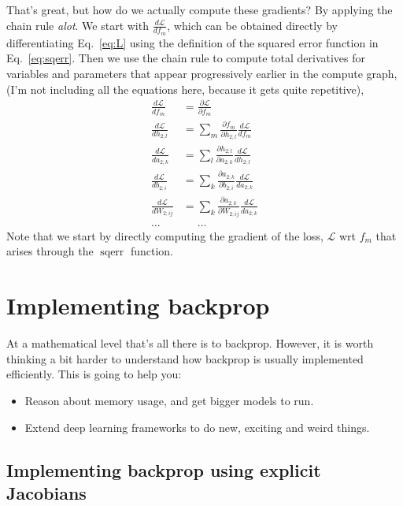 \documentclass{article}
\newcommand{\dd}[2][]{\frac{\partial #1}{\partial #2}}
\newcommand{\dt}[2][]{\frac{d #1}{d #2}}
\newcommand{\dL}{\dt[\L]}
\renewcommand{\L}{\mathcal{L}}
\newcommand{\sqerr}{\operatorname{sqerr}}
\begin{document}
That's great, but how do we actually compute these gradients?
By applying the chain rule \textit{alot}.
We start with $\dL{f_m}$, which can be obtained directly by differentiating Eq.~\eqref{eq:L} using the definition of the squared error function in Eq.~\eqref{eq:sqerr}.
Then we use the chain rule to compute total derivatives for variables and parameters that appear progressively earlier in the compute graph, (I'm not including all the equations here, because it gets quite repetitive),
\begin{subequations}
\label{eq:back_chain}
\begin{align}
  \dL{f_m} &= \dd[\L]{f_m}\\
  \label{eq:back_chain:1}
  \dL{h_{2; l}} &= \sum_m \dd[f_m]{h_{2;l}} \dL{f_m}\\
  \label{eq:back_chain:2}
  \dL{a_{2; k}} &= \sum_l \dd[h_{2;l}]{a_{2;k}} \dL{h_{2; l}}\\
  \dL{b_{2;i}} &= \sum_{k} \dd[a_{2; k}]{b_{2; i}} \dL{a_{2; k}} \\
  \label{eq:back_chain:4}
  \dL{W_{2;ij}} &= \sum_{k} \dd[a_{2; k}]{W_{2; ij}} \dL{a_{2; k}}\\
  \dots &\phantom{=} \dots
\end{align}
\end{subequations}
Note that we start by directly computing the gradient of the loss, $\L$ wrt $f_m$ that arises through the $\sqerr$ function.

\section{Implementing backprop}

At a mathematical level that's all there is to backprop.
However, it is worth thinking a bit harder to understand how backprop is usually implemented efficiently.
This is going to help you: 
\begin{itemize}
  \item Reason about memory usage, and get bigger models to run.
  \item Extend deep learning frameworks to do new, exciting and weird things.
\end{itemize}

\subsection{Implementing backprop using explicit Jacobians}
\end{document}
